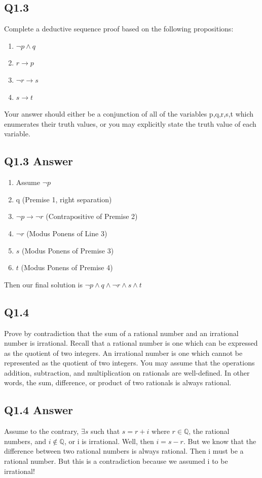 \documentclass{article}
\begin{document}
\subsection*{Q1.3}
Complete a deductive sequence proof based on the following propositions:
\begin{enumerate}
    \item $\lnot p \land q$
    \item $r \rightarrow p$
    \item $\lnot r \rightarrow s$
    \item $s \rightarrow t$
\end{enumerate}
Your answer should either be a conjunction of all of the variables p,q,r,s,t which enumerates their
truth values, or you may explicitly state the truth value of each variable.
\newpage
{}
\subsection*{Q1.3 Answer}
\begin{enumerate}
    \item Assume $\lnot p$
    \item q (Premise 1, right separation)
    \item $\lnot p \rightarrow \lnot r$ (Contrapositive of Premise 2)
    \item $\lnot r$ (Modus Ponens of Line 3)
    \item $s$ (Modus Ponens of Premise 3)
    \item $t$ (Modus Ponens of Premise 4)
\end{enumerate}
Then our final solution is $\lnot p \land q \land \lnot r \land s \land t$
\newpage
{}
\subsection*{Q1.4}
Prove by contradiction that the sum of a rational number and an irrational number is irrational. Recall that a rational number is one
which can be expressed as the quotient of two integers. An irrational number is one which cannot be represented as the quotient of two integers.
You may assume that the operations addition, subtraction, and multiplication on rationals are well-defined. In other words, the sum, difference, or
product of two rationals is always rational.
\newpage
{}
\subsection*{Q1.4 Answer}
Assume to the contrary, $\exists s$ such that $s = r + i$ where $r \in \mathbb{Q}$, the rational numbers, and $i \notin \mathbb{Q}$, or i is irrational.
Well, then $i = s - r$. But we know that the difference between two rational numbers is always rational. Then i must be a rational number. But this is a contradiction
because we assumed i to be irrational! 
\newpage
{}
\end{document}
